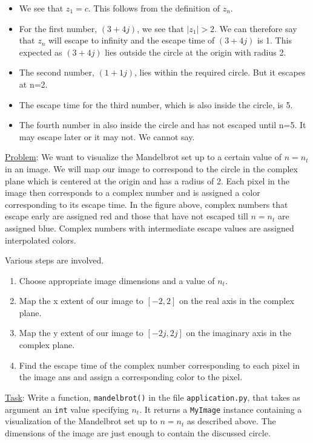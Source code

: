 \documentclass[addpoints]{exam}
\begin{document}
\begin{questions}
  \begin{itemize}
  \item We see that $z_1=c$. This follows from the definition of $z_n$.
  \item For the first number, $(3+4j)$, we see that $|z_1|>2$. We can therefore say that $z_n$ will escape to infinity and the escape time of $(3+4j)$ is 1. This expected as $(3+4j)$ lies outside the circle at the origin with radius 2.
  \item The second number, $(1+1j)$, lies within the required circle. But it escapes at n=2.
  \item The escape time for the third number, which is also inside the circle, is 5.
  \item The fourth number in also inside the circle and has not escaped until n=5. It may escape later or it may not. We cannot say.
  \end{itemize}
  
  \underline{Problem}: We want to visualize the Mandelbrot set up to a certain value of $n=n_t$ in an image. We will map our image to correspond to the circle in the complex plane which is centered at the origin and has a radius of 2. Each pixel in the image then corresponds to a complex number and is assigned a color corresponding to its escape time. In the figure above, complex numbers that escape early are assigned red and those that have not escaped till $n=n_t$ are assigned blue. Complex numbers with intermediate escape values are assigned interpolated colors. 

  Various steps are involved.
  \begin{enumerate}
\item Choose appropriate image dimensions and a value of $n_t$.
\item Map the x extent of our image to $[-2,2]$ on the real axis in the complex plane.
\item Map the y extent of our image to $[-2j,2j]$ on the imaginary axis in the complex plane.
\item Find the escape time of the complex number corresponding to each pixel in the image ans and assign a corresponding color to the pixel.
\end{enumerate}

  \underline{Task}: Write a function, \texttt{mandelbrot()} in the file \texttt{application.py}, that takes as argument an \texttt{int} value specifying $n_t$. It returns a \texttt{MyImage} instance containing a visualization of the Mandelbrot set up to $n=n_t$ as described above. The dimensions of the image are just enough to contain the discussed circle.


\end{questions}
\end{document}
